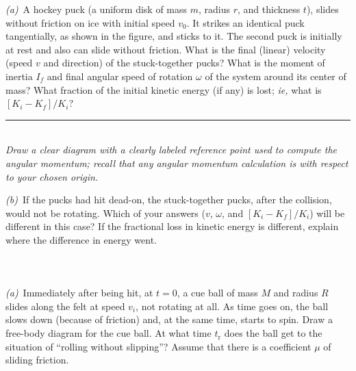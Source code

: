 \documentclass[12pt]{article}
\newcounter{problem}
\begin{document}
\textsl{(a)}~A hockey puck (a uniform disk of mass $m$, radius $r$,
and thickness $t$), slides without friction on ice with initial speed
$v_0$.  It strikes an identical puck tangentially, as shown in the
figure, and sticks to it.  The second puck is initially at rest and
also can slide without friction.  What is the final (linear) velocity
(speed $v$ and direction) of the stuck-together pucks?  What is the
moment of inertia $I_f$ and final angular speed of rotation $\omega$
of the system around its center of mass?  What fraction of the initial
kinetic energy (if any) is lost; \textit{ie,} what is $[K_i-K_f]/K_i$?
\\ \rule{0.25\textwidth}{0pt}
\\

\emph{Draw a clear diagram with a clearly labeled reference point used
to compute the angular momentum; recall that any angular momentum
calculation is with respect to your chosen origin.}

\textsl{(b)}~If the pucks had hit dead-on, the stuck-together pucks,
after the collision, would not be rotating.  Which of your answers
($v$, $\omega$, and $[K_i-K_f]/K_i$) will be different in this case?
If the fractional loss in kinetic energy is different, explain where
the difference in energy went.


\paragraph{\problemname~\theproblem}

\textsl{(a)}~Immediately after being hit, at $t=0$, a cue ball of mass
$M$ and radius $R$ slides along the felt at speed $v_i$, not rotating
at all.  As time goes on, the ball slows down (because of friction)
and, at the same time, starts to spin.  Draw a free-body diagram for
the cue ball.  At what time $t_\mathrm{r}$ does the ball get to the
situation of ``rolling without slipping''?  Assume that there is a
coefficient $\mu$ of sliding friction.
\end{document}
